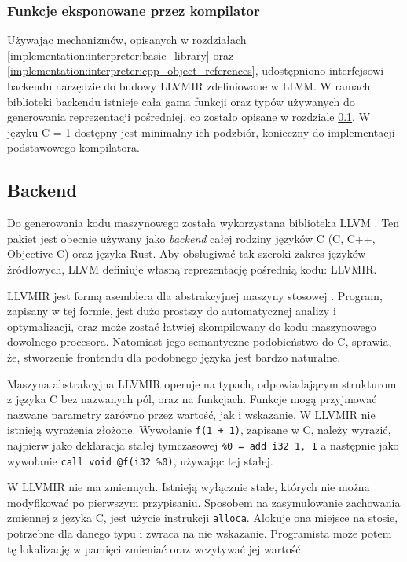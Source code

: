 \subsubsection{Funkcje eksponowane przez kompilator}

Używając mechanizmów, opisanych w rozdziałach \ref{implementation:interpreter:basic_library} oraz \ref{implementation:interpreter:cpp_object_references}, udostępniono interfejsowi backendu narzędzie do budowy LLVMIR zdefiniowane w LLVM.
W ramach biblioteki backendu istnieje cała gama funkcji oraz typów używanych do generowania reprezentacji pośredniej, co zostało opisane w rozdziale \ref{implementation:backend}.
W języku C-=-1 dostępny jest minimalny ich podzbiór, konieczny do implementacji podstawowego kompilatora.



\subsection{Backend}
\label{implementation:backend}
Do generowania kodu maszynowego została wykorzystana biblioteka LLVM \cite{Lattner:MSThesis02}.
Ten pakiet jest obecnie używany jako \emph{backend} całej rodziny języków C (C, C++, Objective-C) oraz języka Rust.
Aby obsługiwać tak szeroki zakres języków źródłowych, LLVM definiuje własną reprezentację pośrednią kodu: LLVMIR.

LLVMIR jest formą asemblera dla abstrakcyjnej maszyny stosowej \cite{llvmir}.
Program, zapisany w tej formie, jest dużo prostszy do automatycznej analizy i optymalizacji, oraz może zostać łatwiej skompilowany do kodu maszynowego dowolnego procesora.
Natomiast jego semantyczne podobieństwo do C, sprawia, że, stworzenie frontendu dla podobnego języka jest bardzo naturalne.

Maszyna abstrakcyjna LLVMIR operuje na typach, odpowiadającym strukturom z języka C bez nazwanych pól, oraz na funkcjach.
Funkcje mogą przyjmować nazwane parametry zarówno przez wartość, jak i wskazanie.
W LLVMIR nie istnieją wyrażenia złożone.
Wywołanie \lstinline{f(1 + 1)}, zapisane w C, należy wyrazić, najpierw jako deklaracja stałej tymczasowej \lstinline{%0 = add i32 1, 1} a następnie jako wywołanie \lstinline{call void @f(i32 %0)}, używając tej stałej.

W LLVMIR nie ma zmiennych.
Istnieją wyłącznie stałe, których nie można modyfikować po pierwszym przypisaniu.
Sposobem na zasymulowanie zachowania zmiennej z języka C, jest użycie instrukcji \lstinline{alloca}.
Alokuje ona miejsce na stosie, potrzebne dla danego typu i zwraca na nie wskazanie.
Programista może potem tę lokalizację w pamięci zmieniać oraz wczytywać jej wartość.

